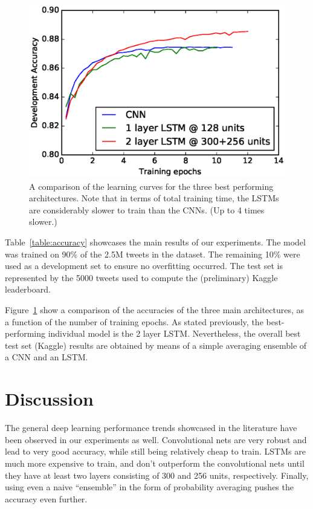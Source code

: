 \documentclass[10pt,conference,compsocconf]{IEEEtran}
\begin{document}
\begin{figure}[tbp]
  \centering
  \includegraphics[width=\columnwidth]{cnn_vs_lstm}
  \caption{A comparison of the learning curves for the three best performing architectures. Note that in terms of total training time,
  the LSTMs are considerably slower to train than the CNNs. (Up to 4 times slower.)}
  \label{fig:cnn-vs-lstm}
\end{figure}

Table~\ref{table:accuracy} showcases the main results of our experiments. The model
was trained on 90\% of the 2.5M tweets in the dataset. The remaining 10\% were used
as a development set to ensure no overfitting occurred. The test set is represented
by the 5000 tweets used to compute the (preliminary) Kaggle leaderboard.

Figure~\ref{fig:cnn-vs-lstm} show a comparison of the accuracies of the
three main architectures, as a function of the number of training epochs.
As stated previously, the best-performing individual model is the 2 layer LSTM.
Nevertheless, the overall best test set (Kaggle) results are obtained
by means of a simple averaging ensemble of a CNN and an LSTM.


\section{Discussion}
\label{sec:discussion}

The general deep learning performance trends showcased in the literature have been observed
in our experiments as well.
Convolutional nets are very robust and lead to very good accuracy, while still
being relatively cheap to train.
LSTMs are much more expensive to train, and don't outperform the
convolutional nets until they have at least two layers consisting of 300 and 256 units,
respectively.
Finally, using even a naive ``ensemble'' in the form of probability averaging
pushes the accuracy even further.
\end{document}
